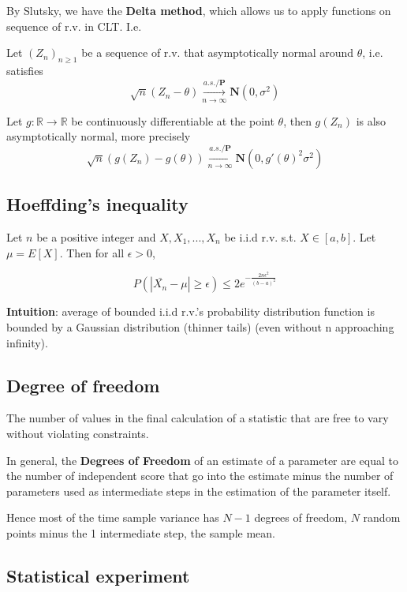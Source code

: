 \documentclass{article}
\begin{document}
By Slutsky, we have the \textbf{Delta method}, which allows us to apply functions on sequence of r.v. in CLT. I.e.

Let $(Z_n)_{n \geq 1}$ be a sequence of r.v. that asymptotically normal around $\theta$, i.e. satisfies
$$
\sqrt{n} (Z_n - \theta) \overset{a.s./\mathbf{P}}{\underset{n \rightarrow \infty}{\longrightarrow}} \mathbf{N}(0, \sigma^2)
$$

Let $g: \mathbb{R} \rightarrow \mathbb{R}$ be continuously differentiable at the point $\theta$, then $g(Z_n)$ is also asymptotically normal, more precisely
$$
\sqrt{n} (g(Z_n) - g(\theta)) \overset{a.s./\mathbf{P}}{\underset{n \rightarrow \infty}{\longrightarrow}} \mathbf{N}(0, g'(\theta)^2 \sigma^2)
$$

\subsection{Hoeffding's inequality}

Let $n$ be a positive integer and $X, X_1, ..., X_n$ be i.i.d r.v. s.t. $X \in [a, b]$. Let $\mu = E[X]$. Then for all $\epsilon > 0$,

$$
P(|\bar{X_n} - \mu| \geq \epsilon) \leq 2 e^{-\frac{2 n \epsilon^2}{(b - a)^2}}
$$

\textbf{Intuition}: average of bounded i.i.d r.v.'s probability distribution function is bounded by a Gaussian distribution (thinner tails) (even without n approaching infinity).

\subsection{Degree of freedom}

The number of values in the final calculation of a statistic that are free to vary without violating constraints.

In general, the \textbf{Degrees of Freedom} of an estimate of a parameter are equal to the number of independent score that go into the estimate minus the number of parameters used as intermediate steps in the estimation of the parameter itself.

Hence most of the time sample variance has $N - 1$ degrees of freedom, $N$ random points minus the 1 intermediate step, the sample mean.

\subsection{Statistical experiment}
\end{document}
